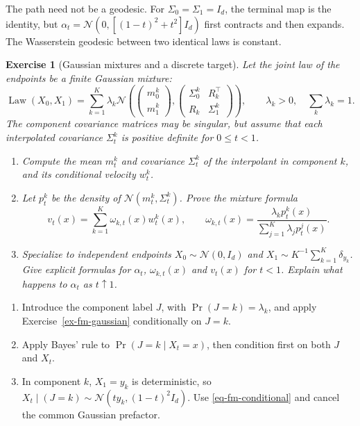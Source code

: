 \documentclass[11pt,a4paper]{article}
\theoremstyle{exostyle}
\newtheorem{exercise}{Exercise}
\newcommand{\R}{\mathbb{R}}
\newcommand{\Law}{\operatorname{Law}}
\newcommand{\Gauss}{\mathcal{N}}
\begin{document}
\begin{solution}
The path need not be a geodesic. For $\Sigma_0=\Sigma_1=I_d$, the
terminal map is the identity, but
$\alpha_t=\Gauss(0,[(1-t)^2+t^2]I_d)$ first contracts and then expands.
The Wasserstein geodesic between two identical laws is constant.
\end{solution}

\newpage
\begin{exercise}[Gaussian mixtures and a discrete target]\label{ex-fm-mixtures}
Let the joint law of the endpoints be a finite Gaussian mixture:
\[
  \Law(X_0,X_1)=\sum_{k=1}^K\lambda_k
   \Gauss\!\left(
     \begin{pmatrix}m_0^k\\m_1^k\end{pmatrix},
     \begin{pmatrix}\Sigma_0^k&R_k^\top\\R_k&\Sigma_1^k\end{pmatrix}
   \right),
  \qquad \lambda_k>0,\quad\sum_k\lambda_k=1.
\]
The component covariance matrices may be singular, but assume that each
interpolated covariance $\Sigma_t^k$ is positive definite for $0\leq t<1$.
\begin{enumerate}[label=(\alph*)]
\item Compute the mean $m_t^k$ and covariance $\Sigma_t^k$ of the
  interpolant in component $k$, and its conditional velocity $w_t^k$.
\item Let $p_t^k$ be the density of $\Gauss(m_t^k,\Sigma_t^k)$.
  Prove the mixture formula
\[
  v_t(x)=\sum_{k=1}^K\omega_{k,t}(x)w_t^k(x),\qquad
  \omega_{k,t}(x)=
     \frac{\lambda_kp_t^k(x)}{\sum_{j=1}^K\lambda_jp_t^j(x)}.
\]
\item Specialize to \emph{independent} endpoints
  $X_0\sim\Gauss(0,I_d)$ and
  $X_1\sim K^{-1}\sum_{k=1}^K\delta_{y_k}$.
  Give explicit formulas for $\alpha_t$, $\omega_{k,t}(x)$ and $v_t(x)$
  for $t<1$. Explain what happens to $\alpha_t$ as $t\uparrow1$.
\end{enumerate}
\end{exercise}
\begin{hints}
\begin{enumerate}[label=(\alph*)]
\item Introduce the component label $J$, with $\Pr(J=k)=\lambda_k$,
  and apply Exercise~\ref{ex-fm-gaussian} conditionally on $J=k$.
\item Apply Bayes' rule to $\Pr(J=k\mid X_t=x)$, then condition
  first on both $J$ and $X_t$.
\item In component $k$, $X_1=y_k$ is deterministic, so
  $X_t\mid(J=k)\sim\Gauss(ty_k,(1-t)^2I_d)$. Use
  \eqref{eq-fm-conditional} and cancel the common Gaussian prefactor.
\end{enumerate}
\end{hints}
\end{document}

